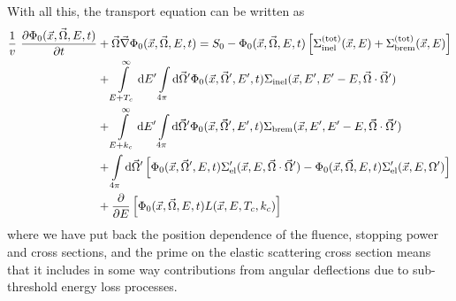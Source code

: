 With all this, the transport equation can be written as
\begin{equation}
\label{transport2}
\begin{split}
\frac{1}{v}~{\partial \Phi_0(\vec{x},\vec{\Omega},E,t) \over 
\partial t} & + \vec{\Omega} \vec{\nabla} \Phi_0(\vec{x},\vec{\Omega},E,t) = 
S_0 
 - \Phi_0(\vec{x},\vec{\Omega},E,t) 
\left[ \Sigma_{\rm inel}^{\rm (tot)}(\vec{x},E) + 
\Sigma_{\rm brem}^{\rm (tot)}(\vec{x},E)
\right] \\
& +  
 \int\limits_{E+T_c}^\infty {\rm d}E' \int\limits_{4 \pi}
{\rm d} \vec{\Omega}' \Phi_0(\vec{x},\vec{\Omega}',E',t) 
\Sigma_{\rm inel}(\vec{x},E',E'-E,\vec{\Omega}\cdot\vec{\Omega}') \\
& +  \int\limits_{E+k_c}^\infty {\rm d}E' \int\limits_{4 \pi} 
{\rm d} \vec{\Omega}' \Phi_0(\vec{x},\vec{\Omega}',E',t) 
\Sigma_{\rm brem}(\vec{x},E',E'-E,\vec{\Omega}\cdot\vec{\Omega}') \\
& + 
 \int\limits_{4 \pi} {\rm d}\vec{\Omega}' 
\left[ \Phi_0(\vec{x},\vec{\Omega}',E,t) 
\Sigma_{\rm el}'(\vec{x},E,\vec{\Omega}\cdot\vec{\Omega}') - 
\Phi_0(\vec{x},\vec{\Omega},E,t) \Sigma_{\rm el}'(\vec{x},E,\Omega') \right] \\
& + \frac{\partial}{\partial E} \left[
\Phi_0(\vec{x},\vec{\Omega},E,t) L(\vec{x},E,T_c,k_c) \right] 
\end{split}
\end{equation}
where we have put back the position dependence of the fluence,  
stopping power and cross sections, and the prime on the elastic scattering 
cross section means that it includes in some way contributions 
from angular deflections due to sub-threshold energy loss processes. 

